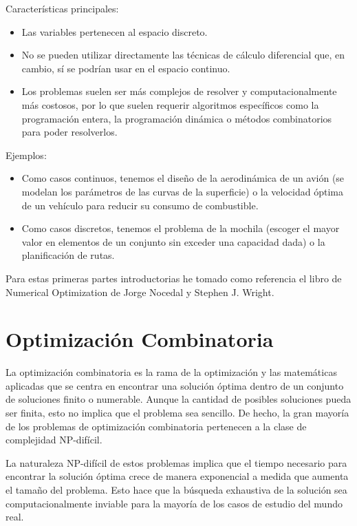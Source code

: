 \documentclass[12pt,a4paper]{book}
\begin{document}
Características principales:
\begin{itemize}
    \item Las variables pertenecen al espacio discreto.
    \item No se pueden utilizar directamente las técnicas de cálculo diferencial que, en cambio, sí se podrían usar en el espacio continuo.
    \item Los problemas suelen ser más complejos de resolver y computacionalmente más costosos, por lo que suelen requerir algoritmos específicos como la programación entera, la programación dinámica o métodos combinatorios para poder resolverlos.
\end{itemize}

Ejemplos:
\begin{itemize}
    \item Como casos continuos, tenemos el diseño de la aerodinámica de un avión (se modelan los parámetros de las curvas de la superficie) o la velocidad óptima de un vehículo para reducir su consumo de combustible.
    \item Como casos discretos, tenemos el problema de la mochila (escoger el mayor valor en elementos de un conjunto sin exceder una capacidad dada) o la planificación de rutas.
\end{itemize}

Para estas primeras partes introductorias he tomado como referencia el libro \cite{Numerical_optimization_nocedal_wright} de Numerical Optimization de Jorge Nocedal y Stephen J. Wright.

\section{Optimización Combinatoria}
La optimización combinatoria es la rama de la optimización y las matemáticas aplicadas que se centra en encontrar una solución óptima dentro de un conjunto de soluciones finito o numerable. Aunque la cantidad de posibles soluciones pueda ser finita, esto no implica que el problema sea sencillo. De hecho, la gran mayoría de los problemas de optimización combinatoria pertenecen a la clase de complejidad NP-difícil.

La naturaleza NP-difícil de estos problemas implica que el tiempo necesario para encontrar la solución óptima crece de manera exponencial a medida que aumenta el tamaño del problema. Esto hace que la búsqueda exhaustiva de la solución sea computacionalmente inviable para la mayoría de los casos de estudio del mundo real.
\end{document}
